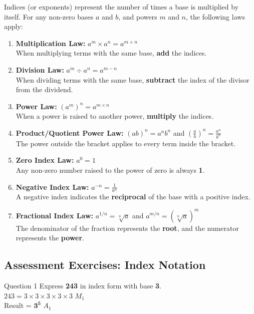 \documentclass[12pt, a4paper, oneside]{article}
\begin{document}
\begin{tcolorbox}[colback=lightgrey, colframe=primaryblue, title=\textbf{Detailed Explanation of the Laws}, arc=5pt]
    Indices (or exponents) represent the number of times a base is multiplied by itself. For any non-zero bases $a$ and $b$, and powers $m$ and $n$, the following laws apply:

    \begin{enumerate}
        \item \textbf{Multiplication Law:} $a^m \times a^n = a^{m+n}$ \\
        When multiplying terms with the same base, \textbf{add} the indices.
        \item \textbf{Division Law:} $a^m \div a^n = a^{m-n}$ \\
        When dividing terms with the same base, \textbf{subtract} the index of the divisor from the dividend.
        \item \textbf{Power Law:} $(a^m)^n = a^{m \times n}$ \\
        When a power is raised to another power, \textbf{multiply} the indices.
        \item \textbf{Product/Quotient Power Law:} $(ab)^n = a^n b^n$ and $(\frac{a}{b})^n = \frac{a^n}{b^n}$ \\
        The power outside the bracket applies to every term inside the bracket.
        \item \textbf{Zero Index Law:} $a^0 = 1$ \\
        Any non-zero number raised to the power of zero is always \textbf{1}.
        \item \textbf{Negative Index Law:} $a^{-n} = \frac{1}{a^n}$ \\
        A negative index indicates the \textbf{reciprocal} of the base with a positive index.
        \item \textbf{Fractional Index Law:} $a^{1/n} = \sqrt[n]{a}$ and $a^{m/n} = (\sqrt[n]{a})^m$ \\
        The denominator of the fraction represents the \textbf{root}, and the numerator represents the \textbf{power}.
    \end{enumerate}
\end{tcolorbox}

\subsection*{Assessment Exercises: Index Notation}

\begin{solvingbox}{Question 1}
Express \textbf{243} in index form with base \textbf{3}. \\
$243 = 3 \times 3 \times 3 \times 3 \times 3$ \hfill $M_1$ \\
Result = $\mathbf{3^5}$ \hfill $A_1$
\end{solvingbox}
\end{document}

